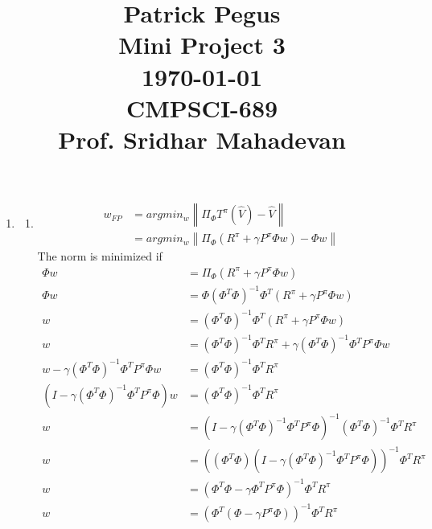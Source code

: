 \documentclass{article}
\newcommand*{\0}{\Vec{0}}
\newcommand*{\ga}{\gamma}
\begin{document}
\title
{\begin{flushleft}
\large
Patrick Pegus\\
Mini Project 3\\
\today\\
CMPSCI-689\\
Prof. Sridhar Mahadevan
\end{flushleft}}
\author{}
\date{}
\maketitle
\normalsize
\begin{enumerate}
	\item
		\begin{enumerate}
			\item
				\begin{align*}
					w_{FP}
					&= argmin_w \left\| \Pi_\Phi T^\pi(\hat{V}) -\hat{V} \right\| \\ \nonumber
					&= argmin_w \left\| \Pi_\Phi \left(R^\pi + \ga P^\pi \Phi w\right) -\Phi w \right\|
				\end{align*}
				The norm is minimized if
				\begin{align*}
					\Phi w &= \Pi_\Phi \left(R^\pi + \ga P^\pi \Phi w\right) \\
					\Phi w &= \Phi\left(\Phi^T \Phi\right)^{-1}\Phi^T \left(R^\pi + \ga P^\pi \Phi w\right) \\
					w &= \left(\Phi^T \Phi\right)^{-1}\Phi^T \left(R^\pi + \ga P^\pi \Phi w\right) \\
					w &= \left(\Phi^T \Phi\right)^{-1}\Phi^T R^\pi + \ga \left(\Phi^T \Phi\right)^{-1}\Phi^T P^\pi \Phi w \\
					w - \ga \left(\Phi^T \Phi\right)^{-1}\Phi^T P^\pi \Phi w &= \left(\Phi^T \Phi\right)^{-1}\Phi^T R^\pi \\
					\left(I - \ga \left(\Phi^T \Phi\right)^{-1}\Phi^T P^\pi \Phi\right)w &= \left(\Phi^T \Phi\right)^{-1}\Phi^T R^\pi \\
					w &= \left(I - \ga \left(\Phi^T \Phi\right)^{-1}\Phi^T P^\pi \Phi\right)^{-1}\left(\Phi^T \Phi\right)^{-1}\Phi^T R^\pi \\
					w &= \left(\left(\Phi^T \Phi\right) \left(I - \ga \left(\Phi^T \Phi\right)^{-1}\Phi^T P^\pi \Phi\right)\right)^{-1}\Phi^T R^\pi \\
					w &= \left(\Phi^T \Phi - \ga \Phi^T P^\pi \Phi\right)^{-1}\Phi^T R^\pi \\
					w &= \left(\Phi^T \left(\Phi - \ga P^\pi \Phi\right)\right)^{-1}\Phi^T R^\pi \\

\end{align*}
\end{enumerate}
\end{enumerate}
\end{document}
